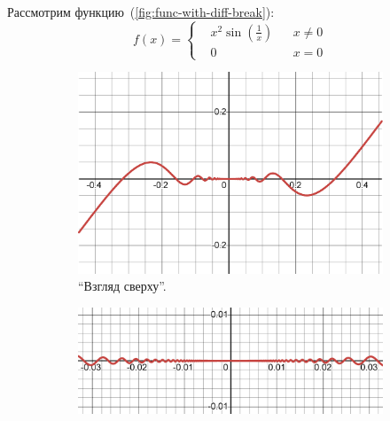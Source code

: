 \documentclass[a4paper,12pt]{article}
\begin{document}
  \begin{example}  %
    Рассмотрим функцию~(\ref{fig:func-with-diff-break}):
    \begin{equation}\label{eq:func-with-diff-break}
      f(x) = \left\{
        \begin{aligned}
          &x^2 \sin{\left(\frac{1}{x}\right)} & &x \not= 0\\
          &0 & &x = 0
        \end{aligned}
      \right.
    \end{equation}

    \begin{figure}[ht]
      \centering
    
      \begin{subfigure}[b]{0.8\textwidth}
        \centering
    
        \includegraphics[width=\columnwidth]{images/x2sinx-1}
    
        \caption{``Взгляд сверху''.}
      \end{subfigure}
      \begin{subfigure}[b]{0.8\textwidth}
        \centering
        
        \includegraphics[width=\columnwidth]{images/x2sinx-1_zoom}
  

\end{subfigure}
\end{figure}
\end{example}
\end{document}
